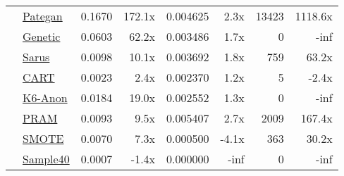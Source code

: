 \begin{table}
\begin{tabular}{llr@{\hskip 6pt}r@{\hskip 14pt}r@{\hskip 6pt}r@{\hskip 14pt}rr}
        \cellcolor{ForestGreen} & \href{https://htmlpreview.github.io/?https://github.com/yoid2000/sdnist-summary/blob/main/results/pategan_n_iter_50_e_10_all/report.html}{Pategan} & 0.1670 & 172.1x & 0.004625 & 2.3x & 13423 & 1118.6x \\
        \cellcolor{YellowGreen} & \href{https://htmlpreview.github.io/?https://github.com/yoid2000/sdnist-summary/blob/main/results/genetic_sd_e_10_simple/report.html}{Genetic} & 0.0603 & 62.2x & 0.003486 & 1.7x & 0 & -inf \\
        \cellcolor{YellowGreen} & \href{https://htmlpreview.github.io/?https://github.com/yoid2000/sdnist-summary/blob/main/results/sarus_sdg_demographic/report.html}{Sarus} & 0.0098 & 10.1x & 0.003692 & 1.8x & 759 & 63.2x \\
        \cellcolor{SkyBlue} & \href{https://htmlpreview.github.io/?https://github.com/yoid2000/sdnist-summary/blob/main/results/cart_cf21/report.html}{CART} & 0.0023 & 2.4x & 0.002370 & 1.2x & 5 & -2.4x \\
        \cellcolor{pink} & \href{https://htmlpreview.github.io/?https://github.com/yoid2000/sdnist-summary/blob/main/results/k_anonymity_k_6/report.html}{K6-Anon} & 0.0184 & 19.0x & 0.002552 & 1.3x & 0 & -inf \\
        \cellcolor{Tan} & \href{https://htmlpreview.github.io/?https://github.com/yoid2000/sdnist-summary/blob/main/results/pram_default/report.html}{PRAM} & 0.0093 & 9.5x & 0.005407 & 2.7x & 2009 & 167.4x \\
        \cellcolor{Sepia} & \href{https://htmlpreview.github.io/?https://github.com/yoid2000/sdnist-summary/blob/main/results/smote_target_marital/report.html}{SMOTE} & 0.0070 & 7.3x & 0.000500 & -4.1x & 363 & 30.2x \\
        \cellcolor{Sepia} & \href{https://htmlpreview.github.io/?https://github.com/yoid2000/sdnist-summary/blob/main/results/subsample_40pcnt_all/report.html}{Sample40} & 0.0007 & -1.4x & 0.000000 & -inf & 0 & -inf \\
        \bottomrule
    \end{tabular}
\end{table}
